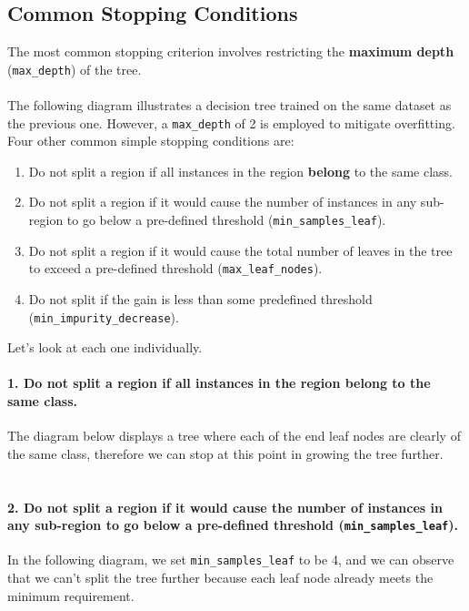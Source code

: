 \documentclass[11pt,a4paper]{report}
\begin{document}
\subsection{Common Stopping Conditions}
The most common stopping criterion involves restricting the \textbf{maximum depth} (\texttt{max\_depth}) of the tree.\\\\
The following diagram illustrates a decision tree trained on the same dataset as the previous one. However, a \texttt{max\_depth} of 2 is employed to mitigate overfitting.\\
Four other common simple stopping conditions are:
\begin{enumerate}
\item Do not split a region if all instances in the region \textbf{belong} to the same class.
\item Do not split a region if it would cause the number of instances in any sub-region to go below a pre-defined threshold (\texttt{min\_samples\_leaf}).
\item Do not split a region if it would cause the total number of leaves in the tree to exceed a pre-defined threshold (\texttt{max\_leaf\_nodes}).
\item Do not split if the gain is less than some pre\-defined threshold (\texttt{min\_impurity\_decrease}).
\end{enumerate}
Let's look at each one individually.
\paragraph{1. Do not split a region if all instances in the region belong to the same class.} The diagram below displays a tree where each of the end leaf nodes are clearly of the same class, therefore we can stop at this point in growing the tree further.\\
\\
\paragraph{2. Do not split a region if it would cause the number of instances in any sub-region to go below a pre-defined threshold (\texttt{min\_samples\_leaf}).}In the following diagram, we set \texttt{min\_samples\_leaf} to be 4, and we can observe that we can't split the tree further because each leaf node already meets the minimum requirement.\\
\end{document}
